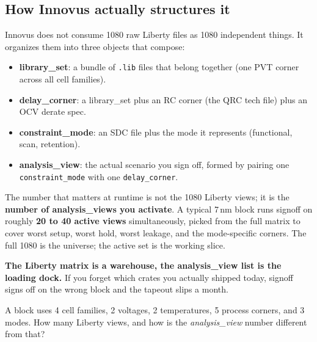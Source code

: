 \subsection{How Innovus actually structures it}

Innovus does not consume 1080 raw Liberty files as 1080 independent things. It organizes them into three objects that compose:

\begin{itemize}
  \item \textbf{library\_set}: a bundle of \texttt{.lib} files that belong together (one PVT corner across all cell families).
  \item \textbf{delay\_corner}: a library\_set plus an RC corner (the QRC tech file) plus an OCV derate spec.
  \item \textbf{constraint\_mode}: an SDC file plus the mode it represents (functional, scan, retention).
  \item \textbf{analysis\_view}: the actual scenario you sign off, formed by pairing one \texttt{constraint\_mode} with one \texttt{delay\_corner}.
\end{itemize}

The number that matters at runtime is not the 1080 Liberty views; it is the \textbf{number of analysis\_views you activate}. A typical 7\,nm block runs signoff on roughly \textbf{20 to 40 active views} simultaneously, picked from the full matrix to cover worst setup, worst hold, worst leakage, and the mode-specific corners. The full 1080 is the universe; the active set is the working slice.

\begin{hook}
\textbf{The Liberty matrix is a warehouse, the analysis\_view list is the loading dock.} If you forget which crates you actually shipped today, signoff signs off on the wrong block and the tapeout slips a month.
\end{hook}

\begin{gut}
A block uses 4 cell families, 2 voltages, 2 temperatures, 5 process corners, and 3 modes. How many Liberty views, and how is the \emph{analysis\_view} number different from that?
\end{gut}

